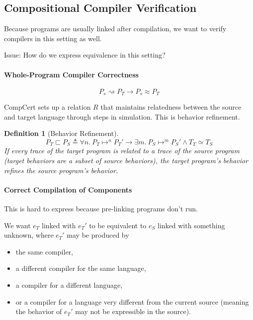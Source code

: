 \documentclass[11pt]{article}
\newcommand{\compile}{\rightsquigarrow}
\newcommand{\imp}{\ensuremath{\longrightarrow}}
\newtheorem{defn}{Definition}[section]
\begin{document}
\subsection{Compositional Compiler Verification}

Because programs are usually linked after compilation, we want to
verify compilers in this setting as well.

Issue:  How do we express equivalence in this setting?

\paragraph{Whole-Program Compiler Correctness}
\[P_s \compile P_T  \imp  P_s \approx P_T\]

CompCert sets up a relation $R$ that maintains relatedness between the
source and target language through steps in simulation.  This is
behavior refinement.

\begin{defn}[Behavior Refinement]
  \[P_T \sqsubset P_S  \triangleq
    \forall n.~P_T \mapsto^n P_T'  \imp  \exists m.~P_S \mapsto^mP_S'
    \wedge T_T \simeq T_S \]
  If every trace of the target program is related to a trace of the
  source program (target behaviors are a subset of source behaviors),
  the target program's behavior refines the source program's
  behavior.
\end{defn}

\paragraph{Correct Compilation of Components}
This is hard to express because pre-linking programs don't run.

We want $e_T$ linked with $e_T'$ to be equivalent to $e_S$ linked with
something unknown, where $e_T'$ may be produced by
\begin{itemize}
\item the same compiler,
\item a different compiler for the same language,
\item a compiler for a different language,
\item or a compiler for a language very different from the current
  source (meaning the behavior of $e_T'$ may not be expressible in the
  source).
\end{itemize}
\end{document}
